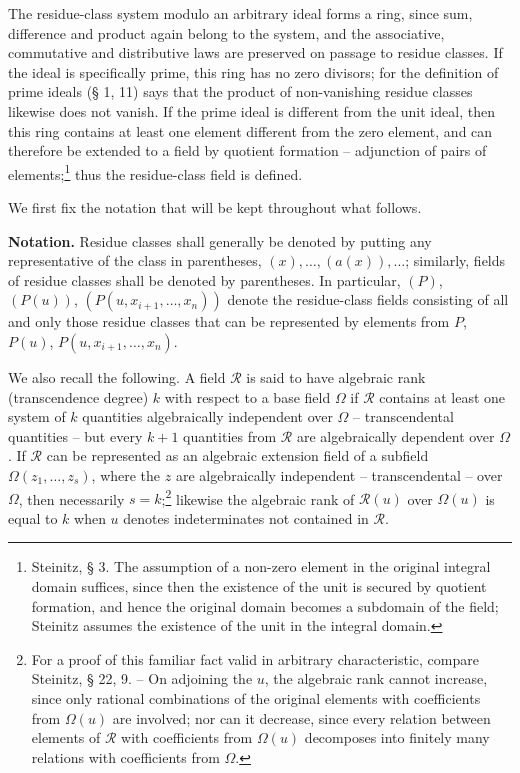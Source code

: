 \documentclass[11pt]{article}
\begin{document}
The residue-class system modulo an arbitrary ideal forms a ring, since sum, difference and product again belong to the system, and the associative, commutative and distributive laws are preserved on passage to residue classes. If the ideal is specifically prime, this ring has no zero divisors; for the definition of prime ideals (§ 1, 11) says that the product of non-vanishing residue classes likewise does not vanish. If the prime ideal is different from the unit ideal, then this ring contains at least one element different from the zero element, and can therefore be extended to a field by quotient formation -- adjunction of pairs of elements;\footnote{Steinitz, § 3. The assumption of a non-zero element in the original integral domain suffices, since then the existence of the unit is secured by quotient formation, and hence the original domain becomes a subdomain of the field; Steinitz assumes the existence of the unit in the integral domain.} thus the residue-class field is defined.

We first fix the notation that will be kept throughout what follows.

\textbf{Notation.} Residue classes shall generally be denoted by putting any representative of the class in parentheses, $(x),\ldots,(a(x)),\ldots$; similarly, fields of residue classes shall be denoted by parentheses. In particular, $(P)$, $(P(u))$, $(P(u,x_{i+1},\ldots,x_n))$ denote the residue-class fields consisting of all and only those residue classes that can be represented by elements from $P$, $P(u)$, $P(u,x_{i+1},\ldots,x_n)$.

We also recall the following. A field $\mathcal R$ is said to have algebraic rank (transcendence degree) $k$ with respect to a base field $\Omega$ if $\mathcal R$ contains at least one system of $k$ quantities algebraically independent over $\Omega$ -- transcendental quantities -- but every $k+1$ quantities from $\mathcal R$ are algebraically dependent over $\Omega$. If $\mathcal R$ can be represented as an algebraic extension field of a subfield $\Omega(z_1,\ldots,z_s)$, where the $z$ are algebraically independent -- transcendental -- over $\Omega$, then necessarily $s=k$;\footnote{For a proof of this familiar fact valid in arbitrary characteristic, compare Steinitz, § 22, 9. -- On adjoining the $u$, the algebraic rank cannot increase, since only rational combinations of the original elements with coefficients from $\Omega(u)$ are involved; nor can it decrease, since every relation between elements of $\mathcal R$ with coefficients from $\Omega(u)$ decomposes into finitely many relations with coefficients from $\Omega$.} likewise the algebraic rank of $\mathcal R(u)$ over $\Omega(u)$ is equal to $k$ when $u$ denotes indeterminates not contained in $\mathcal R$.
\end{document}
